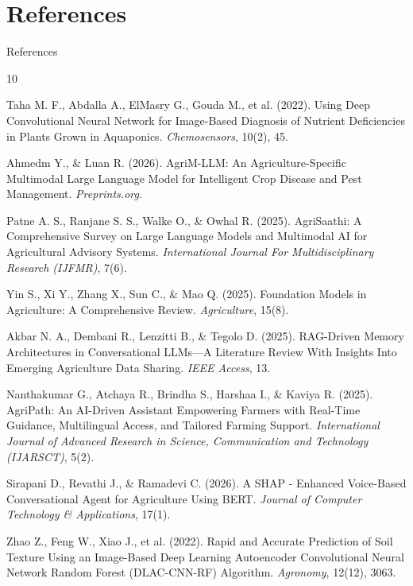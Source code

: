\documentclass{beamer}
\begin{document}
\section*{References}
\begin{frame}[allowframebreaks]{References}
	\scriptsize
	\begin{thebibliography}{10}
		
		Taha M. F., Abdalla A., ElMasry G., Gouda M., et al. (2022).
		\newblock Using Deep Convolutional Neural Network for Image-Based Diagnosis of Nutrient Deficiencies in Plants Grown in Aquaponics.
		\newblock \emph{Chemosensors}, 10(2), 45.
		
		Ahmedm Y., \& Luan R. (2026).
		\newblock AgriM-LLM: An Agriculture-Specific Multimodal Large Language Model for Intelligent Crop Disease and Pest Management.
		\newblock \emph{Preprints.org}.
		
		Patne A. S., Ranjane S. S., Walke O., \& Owhal R. (2025).
		\newblock AgriSaathi: A Comprehensive Survey on Large Language Models and Multimodal AI for Agricultural Advisory Systems.
		\newblock \emph{International Journal For Multidisciplinary Research (IJFMR)}, 7(6).
		
		Yin S., Xi Y., Zhang X., Sun C., \& Mao Q. (2025).
		\newblock Foundation Models in Agriculture: A Comprehensive Review.
		\newblock \emph{Agriculture}, 15(8).
		
		Akbar N. A., Dembani R., Lenzitti B., \& Tegolo D. (2025).
		\newblock RAG-Driven Memory Architectures in Conversational LLMs—A Literature Review With Insights Into Emerging Agriculture Data Sharing.
		\newblock \emph{IEEE Access}, 13.
		
		Nanthakumar G., Atchaya R., Brindha S., Harshaa I., \& Kaviya R. (2025).
		\newblock AgriPath: An AI-Driven Assistant Empowering Farmers with Real-Time Guidance, Multilingual Access, and Tailored Farming Support.
		\newblock \emph{International Journal of Advanced Research in Science, Communication and Technology (IJARSCT)}, 5(2).
		
		Sirapani D., Revathi J., \& Ramadevi C. (2026).
		\newblock A SHAP - Enhanced Voice-Based Conversational Agent for Agriculture Using BERT.
		\newblock \emph{Journal of Computer Technology \& Applications}, 17(1).
		
		Zhao Z., Feng W., Xiao J., et al. (2022).
		\newblock Rapid and Accurate Prediction of Soil Texture Using an Image-Based Deep Learning Autoencoder Convolutional Neural Network Random Forest (DLAC-CNN-RF) Algorithm.
		\newblock \emph{Agronomy}, 12(12), 3063.
		

\end{thebibliography}
\end{frame}
\end{document}
